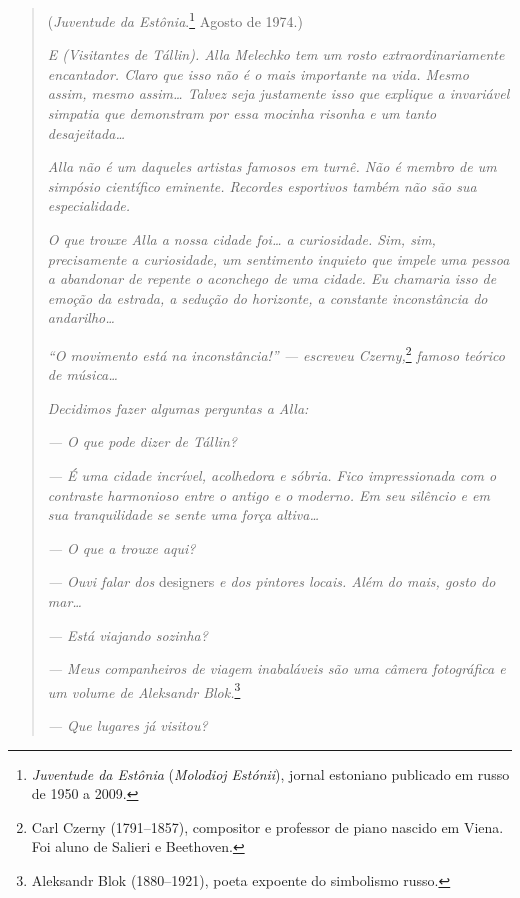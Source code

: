 \begin{quotation}
\begin{flushright}
(\emph{Juventude da Estônia}.\footnote{\emph{Juventude da Estônia}
  (\emph{Molodioj Estónii}), jornal estoniano publicado em russo de 1950
  a 2009.} Agosto de 1974.)
\end{flushright}
\vspace{4pt}
\noindent\emph{E (Visitantes de Tállin). Alla Melechko tem um
rosto extraordinariamente encantador. Claro que isso não é o mais
importante na vida. Mesmo assim, mesmo assim\ldots{} Talvez seja justamente
isso que explique a invariável simpatia que demonstram por essa mocinha
risonha e um tanto desajeitada\ldots{}}

\emph{Alla não é um daqueles artistas famosos em turnê. Não é membro de
um simpósio científico eminente. Recordes esportivos também não são sua
especialidade.}

\emph{O que trouxe Alla a nossa cidade foi\ldots{} a curiosidade. Sim, sim,
precisamente a curiosidade, um sentimento inquieto que impele uma pessoa
a abandonar de repente o aconchego de uma cidade. Eu chamaria isso de
emoção da estrada, a sedução do horizonte, a constante inconstância do
andarilho\ldots{}}

\emph{``O movimento está na inconstância!'' --- escreveu
Czerny,}\footnote{Carl Czerny (1791--1857), compositor e professor de
  piano nascido em Viena. Foi aluno de Salieri e Beethoven.}
\emph{famoso teórico de música\ldots{}}

\emph{Decidimos fazer algumas perguntas a Alla:}

\emph{--- O que pode dizer de Tállin?}

\emph{--- É uma cidade incrível, acolhedora e sóbria. Fico impressionada
com o contraste harmonioso entre o antigo e o moderno. Em seu silêncio e
em sua tranquilidade se sente uma força altiva\ldots{}}

\emph{--- O que a trouxe aqui?}

\emph{--- Ouvi falar dos} designers \emph{e dos pintores locais. Além do
mais, gosto do mar\ldots{}}

\emph{--- Está viajando sozinha?}

\emph{--- Meus companheiros de viagem inabaláveis são uma câmera
fotográfica e um volume de Aleksandr Blok.}\footnote{Aleksandr Blok
  (1880--1921), poeta expoente do simbolismo russo.}

\emph{--- Que lugares já visitou?}


\end{quotation}
